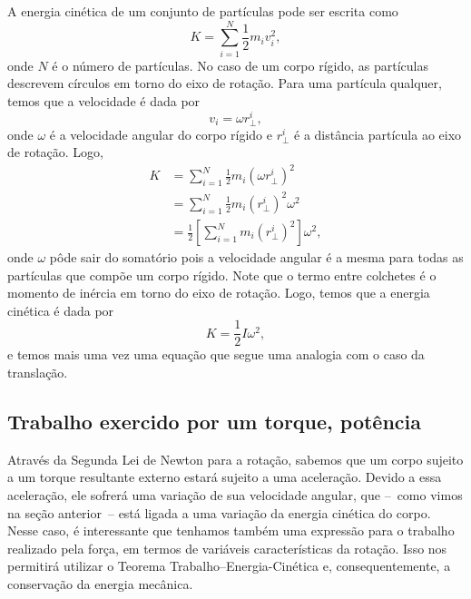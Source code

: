 A energia cinética de um conjunto de partículas pode ser escrita como
\begin{equation}
	K = \sum_{i=1}^N \frac{1}{2} m_i v_i^2,
\end{equation}
%
onde $N$ é o número de partículas. No caso de um corpo rígido, as partículas descrevem círculos em torno do eixo de rotação. Para uma partícula qualquer, temos que a velocidade é dada por
\begin{equation}
    v_i = \omega r_\perp^i,
\end{equation}
%
onde $\omega$ é a velocidade angular do corpo rígido e $r_\perp^i$ é a distância  partícula ao eixo de rotação. Logo,
\begin{align}
	K &= \sum_{i=1}^{N} \frac{1}{2} m_i (\omega r_\perp^i)^2 \\
	&= \sum_{i=1}^N \frac{1}{2} m_i (r_\perp^i)^2 \omega^2 \\
	&= \frac{1}{2} \left[\sum_{i=1}^N m_i (r_\perp^i)^2\right] \omega^2,
\end{align}
%
onde $\omega$ pôde sair do somatório pois a velocidade angular é a mesma para todas as partículas que compõe um corpo rígido. Note que o termo entre colchetes é o momento de inércia em torno do eixo de rotação. Logo, temos que a energia cinética é dada por
\begin{equation}
	K = \frac{1}{2} I \omega^2,
\end{equation}
%
e temos mais uma vez uma equação que segue uma analogia com o caso da translação.

\subsection{Trabalho exercido por um torque, potência}

Através da Segunda Lei de Newton para a rotação, sabemos que um corpo sujeito a um torque resultante externo estará sujeito a uma aceleração. Devido a essa aceleração, ele sofrerá uma variação de sua velocidade angular, que --~como vimos na seção anterior~-- está ligada a uma variação da energia cinética do corpo. Nesse caso, é interessante que tenhamos também uma expressão para o trabalho realizado pela força, em termos de variáveis características da rotação. Isso nos permitirá utilizar o Teorema Trabalho--Energia-Cinética e, consequentemente, a conservação da energia mecânica.

